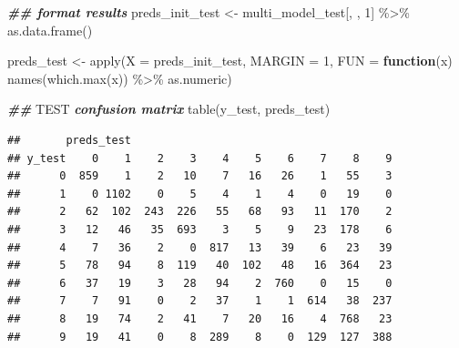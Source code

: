 \documentclass[
]{book}
\newenvironment{Shaded}{\begin{snugshade}}{\end{snugshade}}
\newcommand{\AlertTok}[1]{\textcolor[rgb]{0.94,0.16,0.16}{#1}}
\newcommand{\AttributeTok}[1]{\textcolor[rgb]{0.77,0.63,0.00}{#1}}
\newcommand{\ControlFlowTok}[1]{\textcolor[rgb]{0.13,0.29,0.53}{\textbf{#1}}}
\newcommand{\DecValTok}[1]{\textcolor[rgb]{0.00,0.00,0.81}{#1}}
\newcommand{\DocumentationTok}[1]{\textcolor[rgb]{0.56,0.35,0.01}{\textbf{\textit{#1}}}}
\newcommand{\FunctionTok}[1]{\textcolor[rgb]{0.00,0.00,0.00}{#1}}
\newcommand{\NormalTok}[1]{#1}
\newcommand{\OtherTok}[1]{\textcolor[rgb]{0.56,0.35,0.01}{#1}}
\newcommand{\SpecialCharTok}[1]{\textcolor[rgb]{0.00,0.00,0.00}{#1}}
\newcommand{\StringTok}[1]{\textcolor[rgb]{0.31,0.60,0.02}{#1}}
\begin{document}
\begin{Shaded}
\end{Shaded}

\begin{Shaded}
\begin{Highlighting}[]
\DocumentationTok{\#\# format results}
\NormalTok{preds\_init\_test }\OtherTok{\textless{}{-}}\NormalTok{ multi\_model\_test[, , }\DecValTok{1}\NormalTok{] }\SpecialCharTok{\%\textgreater{}\%}
  \FunctionTok{as.data.frame}\NormalTok{()}

\NormalTok{preds\_test }\OtherTok{\textless{}{-}} \FunctionTok{apply}\NormalTok{(}\AttributeTok{X =}\NormalTok{ preds\_init\_test,}
               \AttributeTok{MARGIN =} \DecValTok{1}\NormalTok{,}
               \AttributeTok{FUN =} \ControlFlowTok{function}\NormalTok{(x) }\FunctionTok{names}\NormalTok{(}\FunctionTok{which.max}\NormalTok{(x)) }\SpecialCharTok{\%\textgreater{}\%}\NormalTok{ as.numeric)}

\DocumentationTok{\#\# }\AlertTok{TEST}\DocumentationTok{ confusion matrix}
\FunctionTok{table}\NormalTok{(y\_test, preds\_test)}
\end{Highlighting}
\end{Shaded}

\begin{verbatim}
##       preds_test
## y_test    0    1    2    3    4    5    6    7    8    9
##      0  859    1    2   10    7   16   26    1   55    3
##      1    0 1102    0    5    4    1    4    0   19    0
##      2   62  102  243  226   55   68   93   11  170    2
##      3   12   46   35  693    3    5    9   23  178    6
##      4    7   36    2    0  817   13   39    6   23   39
##      5   78   94    8  119   40  102   48   16  364   23
##      6   37   19    3   28   94    2  760    0   15    0
##      7    7   91    0    2   37    1    1  614   38  237
##      8   19   74    2   41    7   20   16    4  768   23
##      9   19   41    0    8  289    8    0  129  127  388
\end{verbatim}
\end{document}
